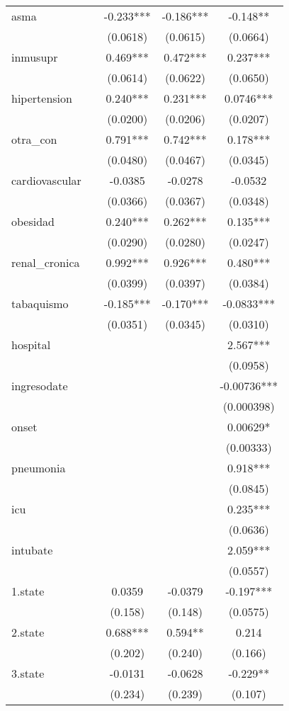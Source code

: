 \documentclass[]{article}
\begin{document}
\begin{tabular}{lcccc}
asma &  & -0.233*** & -0.186*** & -0.148** \\
 &  & (0.0618) & (0.0615) & (0.0664) \\
inmusupr &  & 0.469*** & 0.472*** & 0.237*** \\
 &  & (0.0614) & (0.0622) & (0.0650) \\
hipertension &  & 0.240*** & 0.231*** & 0.0746*** \\
 &  & (0.0200) & (0.0206) & (0.0207) \\
otra\_con &  & 0.791*** & 0.742*** & 0.178*** \\
 &  & (0.0480) & (0.0467) & (0.0345) \\
cardiovascular &  & -0.0385 & -0.0278 & -0.0532 \\
 &  & (0.0366) & (0.0367) & (0.0348) \\
obesidad &  & 0.240*** & 0.262*** & 0.135*** \\
 &  & (0.0290) & (0.0280) & (0.0247) \\
renal\_cronica &  & 0.992*** & 0.926*** & 0.480*** \\
 &  & (0.0399) & (0.0397) & (0.0384) \\
tabaquismo &  & -0.185*** & -0.170*** & -0.0833*** \\
 &  & (0.0351) & (0.0345) & (0.0310) \\
hospital &  &  &  & 2.567*** \\
 &  &  &  & (0.0958) \\
ingresodate &  &  &  & -0.00736*** \\
 &  &  &  & (0.000398) \\
onset &  &  &  & 0.00629* \\
 &  &  &  & (0.00333) \\
pneumonia &  &  &  & 0.918*** \\
 &  &  &  & (0.0845) \\
icu &  &  &  & 0.235*** \\
 &  &  &  & (0.0636) \\
intubate &  &  &  & 2.059*** \\
 &  &  &  & (0.0557) \\
1.state &  & 0.0359 & -0.0379 & -0.197*** \\
 &  & (0.158) & (0.148) & (0.0575) \\
2.state &  & 0.688*** & 0.594** & 0.214 \\
 &  & (0.202) & (0.240) & (0.166) \\
3.state &  & -0.0131 & -0.0628 & -0.229** \\
 &  & (0.234) & (0.239) & (0.107) \\

\end{tabular}
\end{document}
